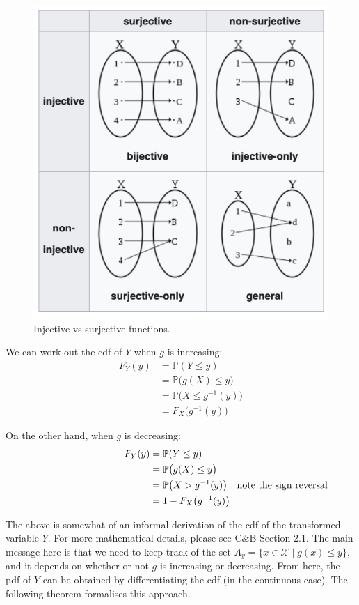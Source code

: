 \documentclass[
]{book}
\newcommand{\bbP}{\mathbb{P}}
\newcommand{\cX}{{\mathcal X}}
\theoremstyle{definition}
\theoremstyle{definition}
\theoremstyle{definition}
\theoremstyle{definition}
\theoremstyle{remark}
\begin{document}
\begin{figure}

{\centering \includegraphics[width=0.6\linewidth]{figure/bijective} 

}

\caption{Injective vs surjective functions.}\label{fig:bijective}
\end{figure}

We can work out the cdf of \(Y\) when \(g\) is increasing:
\begin{align}
F_Y(y) 
&= \bbP(Y \leq y) \nonumber \\
&= \bbP\big(g(X) \leq y\big)  \nonumber \\
&= \bbP\big(X \leq g^{-1}(y)\big)  \nonumber \\
&= F_X\big(g^{-1}(y)\big) \label{eq:cdftransform1}
\end{align}

On the other hand, when \(g\) is decreasing:
\begin{align}
F_Y(y) 
&= \bbP(Y \leq y)  \nonumber \\
&= \bbP\big(g(X) \leq y\big) \nonumber \\
&= \bbP\big(X > g^{-1}(y)\big) \hspace{1em} \rlap{\text{note the sign reversal}}  \nonumber \\
&= 1 - F_X\big(g^{-1}(y)\big) \label{eq:cdftransform2}
\end{align}

The above is somewhat of an informal derivation of the cdf of the transformed variable \(Y\).
For more mathematical details, please see C\&B Section 2.1.
The main message here is that we need to keep track of the set \(A_y=\{x \in \cX \mid g(x) \leq y \}\), and it depends on whether or not \(g\) is increasing or decreasing.
From here, the pdf of \(Y\) can be obtained by differentiating the cdf (in the continuous case).
The following theorem formalises this approach.
\end{document}
